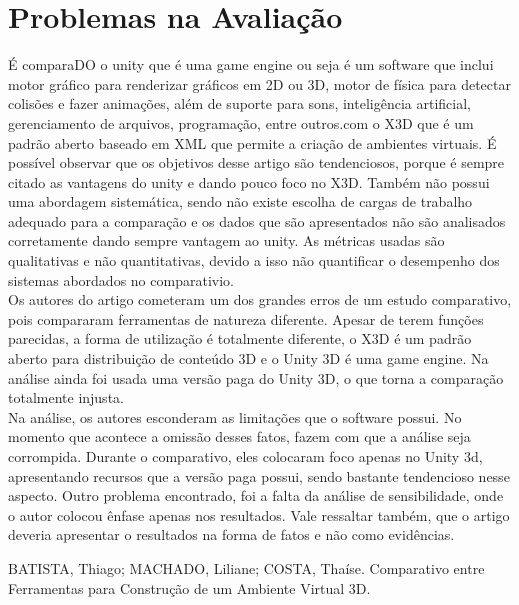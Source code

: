 \documentclass[conference]{IEEEtran}
\begin{document}
\section*{Problemas na Avaliação}
É comparaDO o unity que é uma game engine ou seja é um software que inclui motor gráfico para renderizar gráficos em 2D ou 3D, motor de física para detectar colisões e fazer animações, além de suporte para sons, inteligência artificial, gerenciamento de arquivos, programação, entre outros.com o X3D que é um padrão aberto baseado em XML que permite a criação de ambientes virtuais. É possível observar que os objetivos desse artigo são tendenciosos, porque é sempre citado as vantagens do unity e dando pouco foco no X3D. Também não possui uma abordagem sistemática, sendo não existe escolha de cargas de trabalho adequado para a comparação e os dados que são apresentados não são analisados corretamente dando sempre vantagem ao unity. As métricas usadas são qualitativas e não quantitativas, devido a isso não quantificar o desempenho dos sistemas abordados no comparativio.\\

Os autores do artigo cometeram um dos grandes erros de um estudo comparativo, pois compararam ferramentas de natureza diferente. Apesar de terem funções parecidas, a forma de utilização é totalmente diferente, o X3D é um padrão aberto para distribuição de conteúdo 3D e o Unity 3D é uma game engine. Na análise ainda foi usada uma versão paga do Unity 3D, o que torna a comparação totalmente injusta.\\
	 	 	
Na análise, os autores esconderam as limitações que o software possui. No momento que acontece a omissão desses fatos, fazem com que a análise seja corrompida. Durante o comparativo, eles colocaram foco apenas no Unity 3d, apresentando recursos que a versão paga possui, sendo bastante tendencioso nesse aspecto. Outro problema encontrado, foi a falta da análise de sensibilidade, onde o autor colocou ênfase apenas nos resultados. Vale ressaltar também, que o artigo deveria apresentar o resultados na forma de fatos e não como evidências.\\

\begin{thebibliography}{00}
BATISTA, Thiago; MACHADO, Liliane; COSTA, Thaíse. Comparativo entre Ferramentas para Construção de um Ambiente Virtual 3D.
\end{thebibliography}
\end{document}
